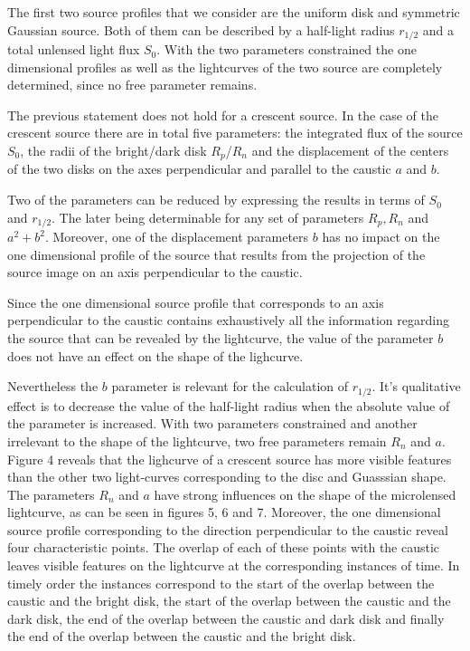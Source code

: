\documentclass[usenatbib]{mn2e}
\begin{document}
The first two source profiles that we consider are the uniform disk and symmetric Gaussian source. 
Both of them can be described by a half-light radius $r_{1/2}$ and a total unlensed light flux $S_0$. 
With the two parameters constrained the one dimensional profiles as well as the lightcurves of the two source are completely determined, since no free parameter remains. 

The previous statement does not hold for a crescent source.
In the case of the crescent source there are in total five parameters: the integrated flux of the source $S_0$,
 the radii of the bright/dark disk $R_p$/$R_n$ and the displacement of the centers of the two disks on the axes perpendicular and parallel to the caustic $a$ and $b$. 

Two of the parameters can be reduced by expressing the results in terms of $S_0$ and $r_{1/2}$. 
The later being determinable for any set of parameters $R_p, R_n$ and $a^2+b^2$. Moreover, one of the displacement 
parameters $b$ has no impact on the one dimensional profile of the source that results from the projection of the source image on an axis perpendicular to the caustic. 

Since the one dimensional source profile that corresponds to an axis perpendicular to the caustic contains exhaustively all the information regarding the source that can be revealed by the lightcurve, 
the value of the parameter $b$ does not have an effect on the shape of the lighcurve. 

Nevertheless the $b$ parameter is relevant for the calculation of $r_{1/2}$. 
It's qualitative effect is to decrease the value of the half-light radius when the absolute value of the parameter is increased.  
With two parameters constrained and another irrelevant to the shape of the lightcurve, two free parameters remain $R_n$ and $a$. 
Figure 4 reveals that the lighcurve of a crescent source has more visible features than the other two light-curves 
corresponding to the disc and Guasssian shape. The parameters $R_n$ and $a$ have strong influences on the shape of 
the microlensed lightcurve, as can be seen in figures 5, 6 and 7. Moreover, the one dimensional source profile corresponding to the direction perpendicular to the caustic reveal four characteristic points. The overlap of each of these points with the caustic leaves visible features on the lightcurve at the corresponding instances of time. In timely order the instances correspond to the start of the overlap between the caustic and the bright disk, the start of the overlap between the caustic and the dark disk, the end of the overlap between the caustic and dark disk and finally the end of the overlap between the caustic and the bright disk.          
\end{document}
